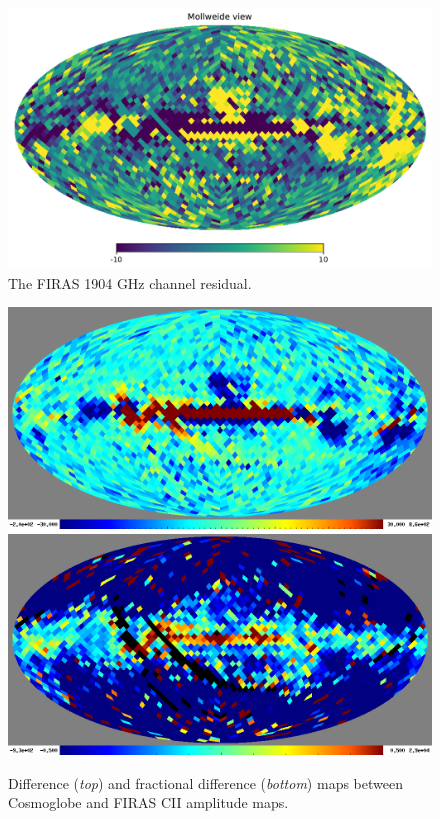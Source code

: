 \documentclass{aa}
\begin{document}
\begin{figure}
    \centering
    \includegraphics[width=\columnwidth]{figures/res_FIRAS_H1904_c0001_k000700.pdf}
    \caption{The FIRAS 1904 GHz channel residual.}
    \label{fig:firas_1904_res}
\end{figure}

\begin{figure}
    \centering
    \includegraphics[width=\columnwidth]{figures/diff_CII_FIRAS_1904_mean.png}\\
    \includegraphics[width=\columnwidth]{figures/fracdiff_CII_FIRAS.png}
    \caption{Difference (\emph{top}) and fractional difference (\emph{bottom}) maps between Cosmoglobe and FIRAS CII amplitude maps.}
    \label{fig:diff_cg_firas}
\end{figure}
\end{document}
